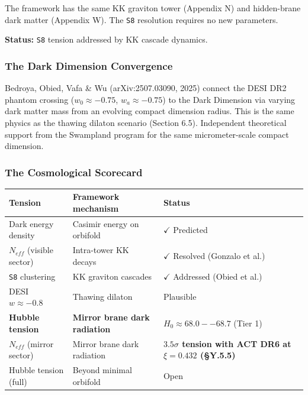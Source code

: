 \documentclass[aps,prd,preprint,superscriptaddress,longbibliography,floatfix]{revtex4-2}
\theoremstyle{remark}
\begin{document}
The framework has the same KK graviton tower (Appendix N) and hidden-brane dark matter (Appendix W). The \texttt{S8} resolution requires no new parameters.

\textbf{Status:} \texttt{S8} tension addressed by KK cascade dynamics.


\subsubsection{The Dark Dimension Convergence}

Bedroya, Obied, Vafa \& Wu (arXiv:2507.03090, 2025) connect the DESI DR2 phantom crossing ($w_{0} \approx -0.75$, $w_{a} \approx -0.75$) to the Dark Dimension via varying dark matter mass from an evolving compact dimension radius. This is the same physics as the thawing dilaton scenario (Section 6.5). Independent theoretical support from the Swampland program for the same micrometer-scale compact dimension.


\subsubsection{The Cosmological Scorecard}


\begin{table}[H]
\begin{ruledtabular}
\begin{tabular}{p{5.0cm}p{5.0cm}p{5.0cm}}
Tension & Framework mechanism & Status \\
\hline
Dark energy density & Casimir energy on orbifold & $\checkmark$ Predicted \\
$N_{eff}$ (visible sector) & Intra-tower KK decays & $\checkmark$ Resolved (Gonzalo et al.) \\
\texttt{S8} clustering & KK graviton cascades & $\checkmark$ Addressed (Obied et al.) \\
DESI $w \approx -0.8$ & Thawing dilaton & Plausible \\
\textbf{Hubble tension} & \textbf{Mirror brane dark radiation} & \textbf{$H_{0} \approx 68.0--68.7$} (Tier 1) \\
$N_{eff}$ (mirror sector) & Mirror brane dark radiation & \textbf{$3.5\sigma$ tension with ACT DR6 at $\xi = 0.432$ (\S{}Y.5.5)} \\
Hubble tension (full) & Beyond minimal orbifold & Open \\
\end{tabular}
\end{ruledtabular}
\end{table}
\end{document}
